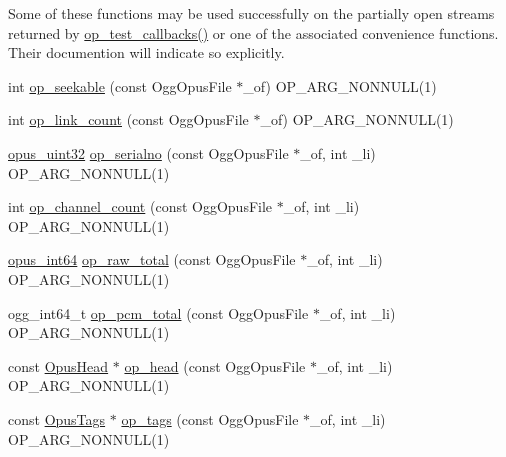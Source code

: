 Some of these functions may be used successfully on the partially open streams returned by \mbox{\hyperlink{group__stream__open__close_ga242081c67e45417e01b82e37fc4e24ea}{op\+\_\+test\+\_\+callbacks()}} or one of the associated convenience functions. Their documention will indicate so explicitly. \begin{DoxyCompactItemize}
\item 
int \mbox{\hyperlink{group__stream__info_ga9272a4a6ac9e01fbc549008f5ff58b4c}{op\+\_\+seekable}} (const Ogg\+Opus\+File $\ast$\+\_\+of) O\+P\+\_\+\+A\+R\+G\+\_\+\+N\+O\+N\+N\+U\+LL(1)
\item 
int \mbox{\hyperlink{group__stream__info_gaaf6ff40725a8bc7e73c9d396ab91837d}{op\+\_\+link\+\_\+count}} (const Ogg\+Opus\+File $\ast$\+\_\+of) O\+P\+\_\+\+A\+R\+G\+\_\+\+N\+O\+N\+N\+U\+LL(1)
\item 
\mbox{\hyperlink{opus__types_8h_a643eaaadb9ef6cd44308e0299d8cd8ce}{opus\+\_\+uint32}} \mbox{\hyperlink{group__stream__info_ga41992ce6f066e07609e5fe2ccd961f40}{op\+\_\+serialno}} (const Ogg\+Opus\+File $\ast$\+\_\+of, int \+\_\+li) O\+P\+\_\+\+A\+R\+G\+\_\+\+N\+O\+N\+N\+U\+LL(1)
\item 
int \mbox{\hyperlink{group__stream__info_ga42c829e67c0ce8359bfbfc31a45c04f4}{op\+\_\+channel\+\_\+count}} (const Ogg\+Opus\+File $\ast$\+\_\+of, int \+\_\+li) O\+P\+\_\+\+A\+R\+G\+\_\+\+N\+O\+N\+N\+U\+LL(1)
\item 
\mbox{\hyperlink{opus__types_8h_ab6742070cf9d0ccffca2b80522b4f41a}{opus\+\_\+int64}} \mbox{\hyperlink{group__stream__info_gaa433bdeab96315d315269b60ba52b877}{op\+\_\+raw\+\_\+total}} (const Ogg\+Opus\+File $\ast$\+\_\+of, int \+\_\+li) O\+P\+\_\+\+A\+R\+G\+\_\+\+N\+O\+N\+N\+U\+LL(1)
\item 
ogg\+\_\+int64\+\_\+t \mbox{\hyperlink{group__stream__info_ga8c228c3d95f2c903ad6cfd2b78d8dad6}{op\+\_\+pcm\+\_\+total}} (const Ogg\+Opus\+File $\ast$\+\_\+of, int \+\_\+li) O\+P\+\_\+\+A\+R\+G\+\_\+\+N\+O\+N\+N\+U\+LL(1)
\item 
const \mbox{\hyperlink{struct_opus_head}{Opus\+Head}} $\ast$ \mbox{\hyperlink{group__stream__info_gabae95dfa8a278a305213332e295443bb}{op\+\_\+head}} (const Ogg\+Opus\+File $\ast$\+\_\+of, int \+\_\+li) O\+P\+\_\+\+A\+R\+G\+\_\+\+N\+O\+N\+N\+U\+LL(1)
\item 
const \mbox{\hyperlink{struct_opus_tags}{Opus\+Tags}} $\ast$ \mbox{\hyperlink{group__stream__info_ga4b9b8b62a9fb04aee64c288e106a4822}{op\+\_\+tags}} (const Ogg\+Opus\+File $\ast$\+\_\+of, int \+\_\+li) O\+P\+\_\+\+A\+R\+G\+\_\+\+N\+O\+N\+N\+U\+LL(1)

\end{DoxyCompactItemize}
